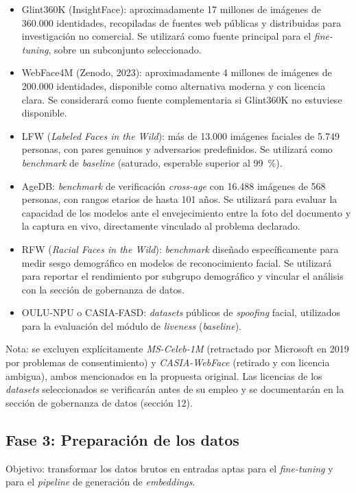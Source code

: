 \documentclass[
  11pt, %
]{charter}
\begin{document}
\begin{itemize}
  \item Glint360K (InsightFace): aproximadamente 17 millones de imágenes de 360.000 identidades, recopiladas de fuentes web públicas y distribuidas para investigación no comercial. Se utilizará como fuente principal para el \textit{fine-tuning}, sobre un subconjunto seleccionado.
  \item WebFace4M (Zenodo, 2023): aproximadamente 4 millones de imágenes de 200.000 identidades, disponible como alternativa moderna y con licencia clara. Se considerará como fuente complementaria si Glint360K no estuviese disponible.
  \item LFW (\textit{Labeled Faces in the Wild}): más de 13.000 imágenes faciales de 5.749 personas, con pares genuinos y adversarios predefinidos. Se utilizará como \textit{benchmark} de \textit{baseline} (saturado, esperable superior al 99~\%).
  \item AgeDB: \textit{benchmark} de verificación \textit{cross-age} con 16.488 imágenes de 568 personas, con rangos etarios de hasta 101 años. Se utilizará para evaluar la capacidad de los modelos ante el envejecimiento entre la foto del documento y la captura en vivo, directamente vinculado al problema declarado.
  \item RFW (\textit{Racial Faces in the Wild}): \textit{benchmark} diseñado específicamente para medir sesgo demográfico en modelos de reconocimiento facial. Se utilizará para reportar el rendimiento por subgrupo demográfico y vincular el análisis con la sección de gobernanza de datos.
  \item OULU-NPU o CASIA-FASD: \textit{datasets} públicos de \textit{spoofing} facial, utilizados para la evaluación del módulo de \textit{liveness} (\textit{baseline}).
\end{itemize}

Nota: se excluyen explícitamente \textit{MS-Celeb-1M} (retractado por Microsoft en 2019 por problemas de consentimiento) y \textit{CASIA-WebFace} (retirado y con licencia ambigua), ambos mencionados en la propuesta original. Las licencias de los \textit{datasets} seleccionados se verificarán antes de su empleo y se documentarán en la sección de gobernanza de datos (sección 12).

\subsection{Fase 3: Preparación de los datos}

Objetivo: transformar los datos brutos en entradas aptas para el \textit{fine-tuning} y para el \textit{pipeline} de generación de \textit{embeddings}.
\end{document}
